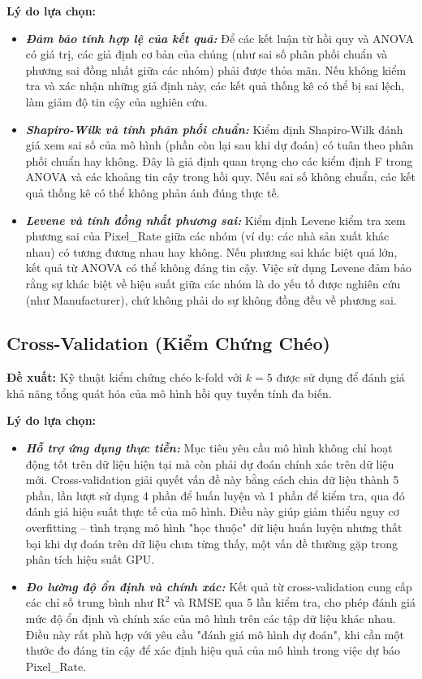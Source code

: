 \textbf{Lý do lựa chọn:}

\begin{itemize}
    \item \textbf{\textit{Đảm bảo tính hợp lệ của kết quả:}} Để các kết luận từ hồi quy và ANOVA có giá trị, các giả định cơ bản của chúng (như sai số phân phối chuẩn và phương sai đồng nhất giữa các nhóm) phải được thỏa mãn. Nếu không kiểm tra và xác nhận những giả định này, các kết quả thống kê có thể bị sai lệch, làm giảm độ tin cậy của nghiên cứu.
    \item \textbf{\textit{Shapiro-Wilk và tính phân phối chuẩn:}} Kiểm định Shapiro-Wilk đánh giá xem sai số của mô hình (phần còn lại sau khi dự đoán) có tuân theo phân phối chuẩn hay không. Đây là giả định quan trọng cho các kiểm định F trong ANOVA và các khoảng tin cậy trong hồi quy. Nếu sai số không chuẩn, các kết quả thống kê có thể không phản ánh đúng thực tế.
    \item \textbf{\textit{Levene và tính đồng nhất phương sai:}} Kiểm định Levene kiểm tra xem phương sai của Pixel\_Rate giữa các nhóm (ví dụ: các nhà sản xuất khác nhau) có tương đương nhau hay không. Nếu phương sai khác biệt quá lớn, kết quả từ ANOVA có thể không đáng tin cậy. Việc sử dụng Levene đảm bảo rằng sự khác biệt về hiệu suất giữa các nhóm là do yếu tố được nghiên cứu (như Manufacturer), chứ không phải do sự không đồng đều về phương sai.
\end{itemize}



\subsection{Cross-Validation (Kiểm Chứng Chéo)}

\textbf{Đề xuất:} Kỹ thuật kiểm chứng chéo k-fold với $k = 5$ được sử dụng để đánh giá khả năng tổng quát hóa của mô hình hồi quy tuyến tính đa biến.

\textbf{Lý do lựa chọn:}

\begin{itemize}
    \item \textbf{\textit{Hỗ trợ ứng dụng thực tiễn:}} Mục tiêu yêu cầu mô hình không chỉ hoạt động tốt trên dữ liệu hiện tại mà còn phải dự đoán chính xác trên dữ liệu mới. Cross-validation giải quyết vấn đề này bằng cách chia dữ liệu thành 5 phần, lần lượt sử dụng 4 phần để huấn luyện và 1 phần để kiểm tra, qua đó đánh giá hiệu suất thực tế của mô hình. Điều này giúp giảm thiểu nguy cơ overfitting – tình trạng mô hình "học thuộc" dữ liệu huấn luyện nhưng thất bại khi dự đoán trên dữ liệu chưa từng thấy, một vấn đề thường gặp trong phân tích hiệu suất GPU.
    \item \textbf{\textit{Đo lường độ ổn định và chính xác:}} Kết quả từ cross-validation cung cấp các chỉ số trung bình như $\text{R}^{\text{2}}$ và RMSE qua 5 lần kiểm tra, cho phép đánh giá mức độ ổn định và chính xác của mô hình trên các tập dữ liệu khác nhau. Điều này rất phù hợp với yêu cầu "đánh giá mô hình dự đoán", khi cần một thước đo đáng tin cậy để xác định hiệu quả của mô hình trong việc dự báo Pixel\_Rate.
\end{itemize}



